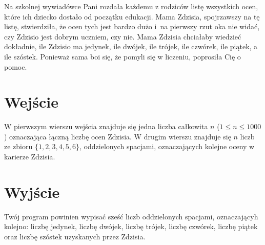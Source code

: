 \documentclass{spiral-kurs}
\begin{document}
\makeheader
%
  Na szkolnej wywiadówce Pani rozdała każdemu z rodziców listę wszystkich ocen, które ich dziecko dostało od początku edukacji.
  Mama Zdzisia, spojrzawszy na tę listę, stwierdziła, że ocen tych jest bardzo dużo i~na pierwszy rzut oka nie widać,
  czy Zdzisio jest dobrym uczniem, czy nie.
  Mama Zdzisia chciałaby wiedzieć dokładnie, ile Zdzisio ma jedynek, ile dwójek, ile trójek, ile czwórek, ile piątek, a ile szóstek.
  Ponieważ sama boi się, że pomyli się w liczeniu, poprosiła Cię o pomoc.

  \section{Wejście}
  W pierwszym wierszu wejścia znajduje się jedna liczba całkowita $n$ ($1 \le n \le 1000$) oznaczająca łączną liczbę ocen Zdzisia.
  W drugim wierszu znajduje się $n$ liczb ze zbioru $\{1,2,3,4,5,6\}$, oddzielonych spacjami,
  oznaczających kolejne oceny w karierze Zdzisia.

  \section{Wyjście}
  Twój program powinien wypisać sześć liczb oddzielonych spacjami, oznaczającyh kolejno:
  liczbę jedynek, liczbę dwójek, liczbę trójek, liczbę czwórek, liczbę piątek oraz liczbę szóstek uzyskanych przez Zdzisia.



  
\end{document}
